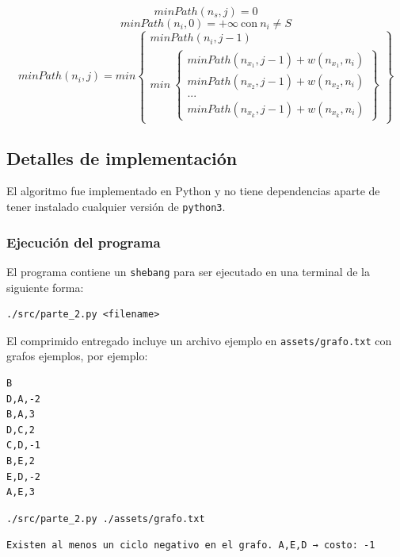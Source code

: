 \documentclass[titlepage,a4paper]{article}
\begin{document}
$$minPath(n_s, j) = 0$$
$$minPath(n_i, 0) = +\infty\ \text{con}\ n_i \neq S$$
$$
minPath(n_i, j) = min \left\{\begin{array}{lcc}
                        minPath(n_i, j-1) \\
                        min\ \left\{\begin{array}{lcc}
                               minPath(n_x_1, j-1) + w(n_x_1,n_i) \\
                               minPath(n_x_2, j-1) + w(n_x_2,n_i) \\
                               ... \\
                               minPath(n_x_k, j-1) + w(n_x_k,n_i)
                             \end{array}\right\}
                      \end{array}\right\}
$$

\subsection{Detalles de implementación}
\label{sec:org469a453}

El algoritmo fue implementado en Python y no tiene dependencias aparte de tener
instalado cualquier versión de \texttt{python3}.

\subsubsection{Ejecución del programa}
\label{sec:org5692f70}

El programa contiene un \texttt{shebang} para ser ejecutado en una terminal de la
siguiente forma:

\begin{verbatim}
./src/parte_2.py <filename>
\end{verbatim}

El comprimido entregado incluye un archivo ejemplo en \texttt{assets/grafo.txt} con grafos ejemplos,
por ejemplo:

\begin{verbatim}
B
D,A,-2
B,A,3
D,C,2
C,D,-1
B,E,2
E,D,-2
A,E,3
\end{verbatim}

\begin{verbatim}
./src/parte_2.py ./assets/grafo.txt
\end{verbatim}

\begin{verbatim}
Existen al menos un ciclo negativo en el grafo. A,E,D → costo: -1
\end{verbatim}
\end{document}
